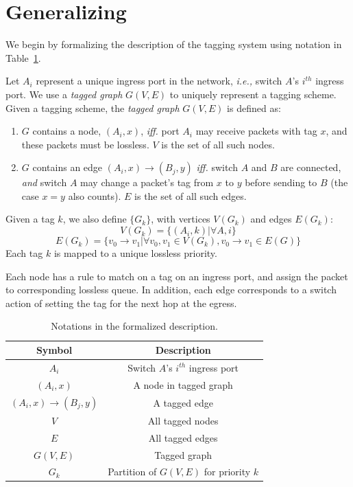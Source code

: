 \section{Generalizing \sysname{}}
\label{sec:generic}

We begin by  formalizing the description of the tagging system using notation in
Table~\ref{tab:symbols}.

Let $A_i$ represent a unique ingress port in the network, {\em i.e.,} switch
$A$'s $i^{th}$ ingress port.  We use a {\em tagged graph} $G(V,E)$ to uniquely
represent a tagging scheme.  Given a tagging scheme, the {\em tagged graph}
$G(V,E)$ is defined as:

\begin{enumerate}
\item $G$ contains a node, $(A_i, x)$, {\em iff.} port $A_i$ may receive packets with tag $x$, and these packets must
be lossless. $V$ is the set of all such nodes.

\item $G$ contains an edge $(A_i, x)\rightarrow(B_j, y)$ {\em iff.} switch $A$ and $B$ are
connected, {\em and} switch $A$ may change a packet's tag from $x$ to $y$ before sending to $B$ (the case $x=y$ also counts).
$E$ is the set of all such edges.

\end{enumerate}

Given a tag $k$, we also define $\{G_k\}$, with vertices $V(G_k)$ and edges
$E(G_k)$:
$$V(G_k) = \{(A_i, k) | \forall A, i\} $$
$$E(G_k) = \{v_0 \rightarrow v_1 | \forall v_0, v_1 \in V(G_k),  v_0 \rightarrow v_1 \in E(G)\} $$
Each tag $k$ is mapped to a unique lossless priority.

Each node has a rule to match on a tag on an ingress port, and assign the packet
to corresponding lossless queue.  In addition, each edge corresponds to a switch
action of setting the tag for the next hop at the egress.

\begin{table}[t]
\small
\centering
\begin{tabular}{|c|c|}
\hline
Symbol & Description \\ \hline
$A_i$ & Switch $A$'s $i^{th}$ ingress port  \\ \hline
$(A_i, x)$ & A node in tagged graph \\ \hline
$(A_i, x)\rightarrow(B_j, y)$ & A tagged edge \\ \hline
$V$ & All tagged nodes  \\ \hline
$E$ & All tagged edges \\ \hline
$G(V, E)$ & Tagged graph \\ \hline
$G_k$ & Partition of $G(V,E)$ for priority $k$ \\ \hline
\end{tabular}
\caption{Notations in the formalized description.}
\label{tab:symbols}
		\vspace{-1em}
\end{table}

